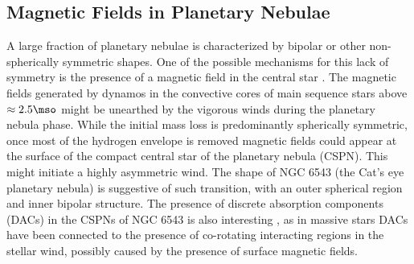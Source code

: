 \subsection{Magnetic Fields in Planetary Nebulae}
A large fraction of planetary nebulae is characterized by bipolar or other non-spherically symmetric shapes. 
One of the possible mechanisms for this lack of symmetry is the presence of a magnetic field in the central star \citep[See e.g.][]{Garc_a_Segura_1997,Chevalier_1994}. The magnetic fields generated by dynamos in the convective cores of main sequence stars above $\approx 2.5\mso$ might be unearthed by the vigorous winds during the planetary nebula phase. While the initial mass loss is predominantly spherically symmetric, once most of the hydrogen envelope is removed magnetic fields could appear at the surface of the compact central star of the planetary nebula (CSPN). This might initiate a highly asymmetric wind. The shape of NGC 6543 (the Cat's eye planetary nebula) is suggestive of such transition, with an outer spherical region and inner bipolar structure. The presence of discrete absorption components (DACs) in the CSPNs of NGC 6543 is also interesting \cite{Prinja_2012}, as in massive stars DACs have been connected to the presence of co-rotating interacting regions in the stellar wind, possibly caused by the presence of surface magnetic fields. 
